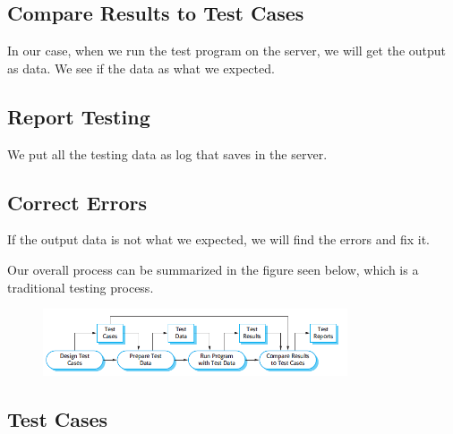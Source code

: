 \subsection*{Compare Results to Test Cases}
In our case, when we run the test program on the server, we will get the output as data. We see if the data as what we expected.

\subsection*{Report Testing}
We put all the testing data as log that saves in the server.

\subsection*{Correct Errors}
If the output data is not what we expected, we will find the errors and fix it.

Our overall process can be summarized in the figure seen below, which is a traditional testing process.

\begin{figure}[ht!]
	\centering
	\includegraphics[width=90mm]{graphics/dynamic_test_specification.png}
	\label{overflow}
\end{figure}


\subsection*{Test Cases}

